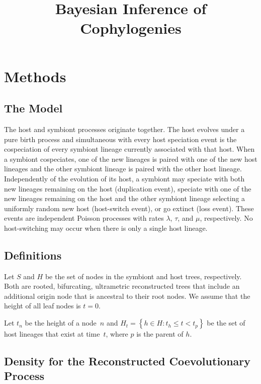 \documentclass{article}
\title{Bayesian Inference of Cophylogenies}
\begin{document}
    \section*{Methods}

        \subsection*{The Model}

            The host and symbiont processes originate together. The host
            evolves under a pure birth process and simultaneous with every host
            speciation event is the cospeciation of every symbiont lineage
            currently associated with that host. When a symbiont cospeciates,
            one of the new lineages is paired with one of the new host lineages
            and the other symbiont lineage is paired with the other host
            lineage. Independently of the evolution of its host, a symbiont may
            speciate with both new lineages remaining on the host (duplication
            event), speciate with one of the new lineages remaining on the host
            and the other symbiont lineage selecting a uniformly random new
            host (host-switch event), or go extinct (loss event). These events
            are independent Poisson processes with rates $\lambda$, $\tau$, and
            $\mu$, respectively. No host-switching may occur when there is only
            a single host lineage.

        \subsection*{Definitions}

            Let $S$ and $H$ be the set of nodes in the symbiont and host trees,
            respectively. Both are rooted, bifurcating, ultrametric
            reconstructed trees that include an additional origin node that is
            ancestral to their root nodes. We assume that the height of all
            leaf nodes is $t = 0$.

            Let $t_n$ be the height of a node~$n$ and $H_t = \left\{h \in H:
            t_h \leq t < t_p\right\}$ be the set of host lineages that exist
            at time~$t$, where $p$ is the parent of $h$.

        \subsection*{Density for the Reconstructed Coevolutionary Process}
\end{document}
